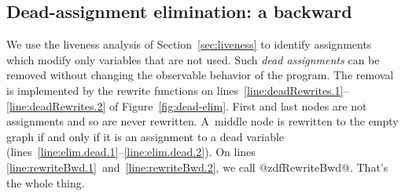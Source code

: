 \documentclass[blockstyle,preprint,natbib,nocopyrightspace]{sigplanconf}
\newcommand\linepairref[2]{lines \ref{line:#1}~and~\ref{line:#2}}
\newcommand\linerangeref[2]{\mbox{lines~\ref{line:#1}--\ref{line:#2}}}
\def\finalremark#1{\relax}
\newcommand\secref[1]{Section~\ref{sec:#1}}
\newcommand\seclabel[1]{\label{sec:#1}}
\newcommand\figref[1]{Figure~\ref{fig:#1}}
\begin{document}
\subsection{Dead-assignment elimination: a backward }


\seclabel{dead-code-elimination}
\seclabel{dead-code-elim}

\seclabel{bwd-rewrite}


\def\liveout{$\mathit{live_{out}}$}

We use the liveness analysis of \secref{liveness} to identify
assignments which modify only variables that are not used.
Such \emph{dead assignments} can be removed without changing the
observable behavior of the program.
The removal is implemented by the rewrite functions on
\linerangeref{deadRewrites.1}{deadRewrites.2} of \figref{dead-elim}. 
First and last nodes are not assignments and so are never
rewritten.
A~middle node is rewritten to the empty graph if and only if it is an
assignment to a dead variable (\linerangeref{elim.dead.1}{elim.dead.2}).
On \linepairref{rewriteBwd.1}{rewriteBwd.2}, we call @zdfRewriteBwd@.
That's the whole thing.\finalremark
{JD: Need to run this version of the code in anger.}
%
\finalremark{In this space we should have some guff about
composing transformations, which should refer to the example on
eliminating the induction variable.
More generally, list some places dead-assignment elim is used and
include \secref{induction-var-elim}.
}
\end{document}
